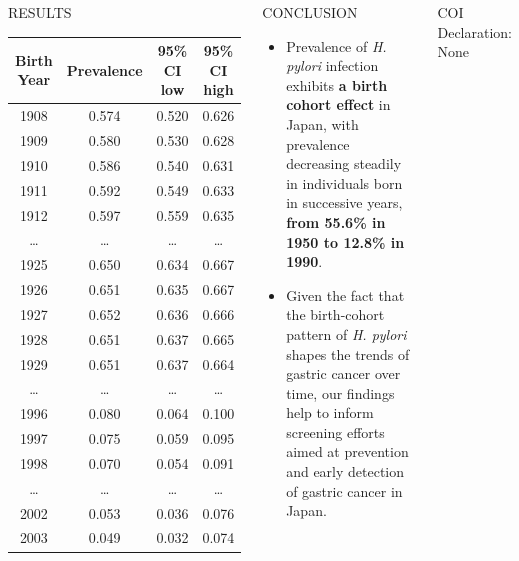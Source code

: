 \documentclass[english,xcolor=table,t
]{beamer}
\begin{document}
\begin{frame}
\begin{columns}
\begin{block}{RESULTS}
\begin{table}[]
\centering
{}
\label{my-label}
\begin{tabular}{@{}cccc@{}}
\toprule
Birth Year & Prevalence & 95\% CI low & 95\% CI high \\ \midrule
1908 & 0.574 & 0.520 & 0.626 \\
1909 & 0.580 & 0.530 & 0.628 \\
1910 & 0.586 & 0.540 & 0.631 \\
1911 & 0.592 & 0.549 & 0.633 \\
1912 & 0.597 & 0.559 & 0.635 \\
\dots & \dots & \dots & \dots \\
1925 & 0.650 & 0.634 & 0.667 \\
1926 & 0.651 & 0.635 & 0.667 \\
\rowcolor[HTML]{F8FF00} 
1927 & 0.652 & 0.636 & 0.666 \\
1928 & 0.651 & 0.637 & 0.665 \\
1929 & 0.651 & 0.637 & 0.664 \\
\dots & \dots & \dots & \dots \\
\rowcolor[HTML]{F8FF00} 
1996 & 0.080 & 0.064 & 0.100 \\
1997 & 0.075 & 0.059 & 0.095 \\
1998 & 0.070 & 0.054 & 0.091 \\
\dots & \dots & \dots & \dots \\
2002 & 0.053 & 0.036 & 0.076 \\
2003 & 0.049 & 0.032 & 0.074 \\ \bottomrule
\end{tabular}
\end{table}

\end{block}

\begin{block}{CONCLUSION}

\begin{itemize}
\item
  Prevalence of \emph{H. pylori} infection exhibits \textbf{a birth
  cohort effect} in Japan, with prevalence decreasing steadily in
  individuals born in successive years, \textbf{from 55.6\% in 1950 to
  12.8\% in 1990}.
\item
  Given the fact that the birth-cohort pattern of \emph{H. pylori}
  shapes the trends of gastric cancer over time, our findings help to
  inform screening efforts aimed at prevention and early detection of
  gastric cancer in Japan.
\end{itemize}

\end{block}

\begin{block}{COI Declaration: None}

\end{block}

\end{columns}

\end{frame}
\end{document}
